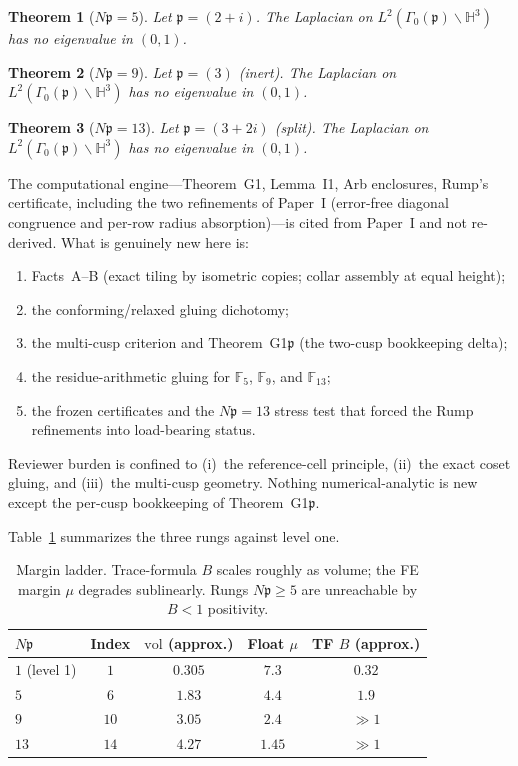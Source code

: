 \documentclass[11pt]{amsart}
\newtheorem{theorem}{Theorem}[section]
\newcommand{\HH}{\mathbb{H}^3}
\newcommand{\p}{\mathfrak{p}}
\newcommand{\vol}{\mathrm{vol}}
\begin{document}
\begin{theorem}[$N\p=5$]\label{thm:5}
Let $\p=(2+i)$.  The Laplacian on $L^2(\Gamma_0(\p)\backslash\HH)$ has
no eigenvalue in $(0,1)$.
\end{theorem}

\begin{theorem}[$N\p=9$]\label{thm:9}
Let $\p=(3)$ (inert).  The Laplacian on $L^2(\Gamma_0(\p)\backslash\HH)$
has no eigenvalue in $(0,1)$.
\end{theorem}

\begin{theorem}[$N\p=13$]\label{thm:13}
Let $\p=(3+2i)$ (split).  The Laplacian on
$L^2(\Gamma_0(\p)\backslash\HH)$ has no eigenvalue in $(0,1)$.
\end{theorem}

The computational engine---Theorem~G1, Lemma~I1, Arb enclosures, Rump's
certificate, including the two refinements of Paper~I (error-free
diagonal congruence and per-row radius absorption)---is cited from
Paper~I and not re-derived.  What is genuinely new here is:
\begin{enumerate}
\item Facts~A--B (exact tiling by isometric copies; collar assembly at
  equal height);
\item the conforming/relaxed gluing dichotomy;
\item the multi-cusp criterion and Theorem~G1$\p$ (the two-cusp
  bookkeeping delta);
\item the residue-arithmetic gluing for $\mathbb{F}_5$, $\mathbb{F}_9$,
  and $\mathbb{F}_{13}$;
\item the frozen certificates and the $N\p=13$ stress test that forced
  the Rump refinements into load-bearing status.
\end{enumerate}
Reviewer burden is confined to (i)~the reference-cell principle,
(ii)~the exact coset gluing, and (iii)~the multi-cusp geometry.  Nothing
numerical-analytic is new except the per-cusp bookkeeping of
Theorem~G1$\p$.

Table~\ref{tab:ladder} summarizes the three rungs against level one.

\begin{table}[ht]
\centering
\begin{tabular}{@{}lcccc@{}}
\toprule
$N\p$ & Index & $\vol$ (approx.) & Float $\mu$ & TF $B$ (approx.) \\
\midrule
$1$ (level 1) & $1$ & $0.305$ & $7.3$ & $0.32$ \\
$5$ & $6$ & $1.83$ & $4.4$ & $1.9$ \\
$9$ & $10$ & $3.05$ & $2.4$ & $\gg 1$ \\
$13$ & $14$ & $4.27$ & $1.45$ & $\gg 1$ \\
\bottomrule
\end{tabular}
\caption{Margin ladder.  Trace-formula $B$ scales roughly as volume;
the FE margin $\mu$ degrades sublinearly.  Rungs $N\p\ge 5$ are
unreachable by $B<1$ positivity.}
\label{tab:ladder}
\end{table}
\end{document}
